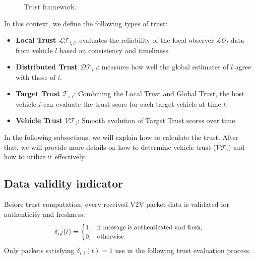 \documentclass{ifacconf}
\def\LO{\mathcal{LO}} %
\def\LT{\mathcal{LT}} %
\def\DT{\mathcal{DT}} %
\def\VT{\mathcal{VT}} %
\def\T{\mathcal{T}} %
\begin{document}
\begin{figure}[h!]
    \caption{Trust framework.}
    \label{fig_trust_framework}
\end{figure}

In this context, we define the following types of trust:
\begin{itemize}
    \item \textbf{Local Trust $\LT_{i,l}$}: evaluates the reliability of the local observer $\LO_{l}$ data from vehicle $l$ based on consistency and timeliness.
    \item \textbf{Distributed Trust $\DT_{i,l}$}: measures how well the global estimates of $l$ agree with those of $i$.
    \item \textbf{Target Trust $\T_{i,l}$}: Combining the Local Trust and Global Trust,  the host vehicle $i$ can evaluate the trust score for each target vehicle at time $t$.
    \item \textbf{Vehicle Trust $\VT_{i}$}: Smooth evolution of Target Trust scores over time.
\end{itemize}

In the following subsections, we will explain how to calculate the trust. After that, we will provide more details on how to determine vehicle trust ($\VT_{i}$) and how to utilize it effectively.
\vspace*{-0.3cm}
\subsection{Data validity indicator}
\vspace*{-0.3cm}

Before trust computation, every received V2V packet data is validated for authenticity and freshness:
\begin{equation}
    \small
    \delta_{i,l}(t)=
    \begin{cases}
        1, & \text{if message}\text{ is authenticated and fresh}, \\
        0, & \text{otherwise.}
    \end{cases}
\end{equation}
Only packets satisfying $\delta_{i,l}(t)=1$ use in the following trust evaluation process.
\end{document}
